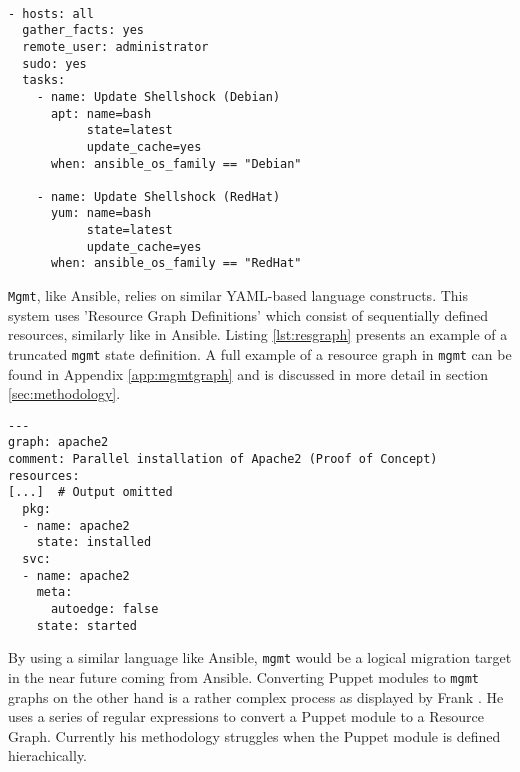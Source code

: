 \\
\begin{lstlisting}[caption={Shellshock security patching with Ansible playbook},label=lst:shellshock]
- hosts: all
  gather_facts: yes
  remote_user: administrator
  sudo: yes
  tasks:
    - name: Update Shellshock (Debian)
      apt: name=bash
           state=latest
           update_cache=yes
      when: ansible_os_family == "Debian"

    - name: Update Shellshock (RedHat)
      yum: name=bash
           state=latest
           update_cache=yes
      when: ansible_os_family == "RedHat"
\end{lstlisting}
\noindent
\texttt{Mgmt}, like Ansible, relies on similar YAML-based language constructs. This system uses 'Resource Graph Definitions' which consist of sequentially defined resources, similarly like in Ansible. Listing \ref{lst:resgraph} presents an example of a truncated \texttt{mgmt} state definition. A full example of a resource graph in \texttt{mgmt} can be found in Appendix \ref{app:mgmtgraph} and is discussed in more detail in section \ref{sec:methodology}.
\\
\begin{lstlisting}[caption={Snippet of Resource Graph Definition},label=lst:resgraph]
---
graph: apache2
comment: Parallel installation of Apache2 (Proof of Concept)
resources:
[...]  # Output omitted
  pkg:
  - name: apache2
    state: installed
  svc:
  - name: apache2
    meta:
      autoedge: false
    state: started
\end{lstlisting}
\noindent
By using a similar language like Ansible, \texttt{mgmt} would be a logical migration target in the near future coming from Ansible. Converting Puppet modules to \texttt{mgmt} graphs on the other hand is a rather complex process as displayed by Frank \cite{frank_2016}. He uses a series of regular expressions to convert a Puppet module to a Resource Graph. Currently his methodology struggles when the Puppet module is defined hierachically.

